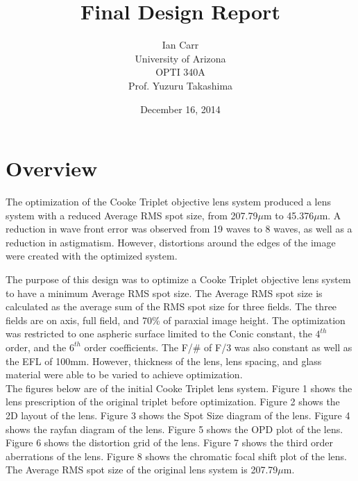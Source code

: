 \documentclass{article}
\begin{document}
\title{Final Design Report}
\author{Ian Carr\\
	University of Arizona\\
	OPTI 340A\\
	Prof. Yuzuru Takashima}
\date{December 16, 2014}
\maketitle

\newpage


\listoffigures 


\section*{Overview}
The optimization of the Cooke Triplet objective lens system produced a lens system with a reduced Average RMS spot size, from 207.79$\mu$m to 45.376$\mu$m. A reduction in wave front error was observed from 19 waves to 8 waves, as well as a reduction in astigmatism. However, distortions around the edges of the image were created with the optimized system.

\newpage

The purpose of this design was to optimize a Cooke Triplet objective lens system to have a minimum Average RMS spot size. The Average RMS spot size is calculated as the average sum of the RMS spot size for three fields. The three fields are on axis, full field, and 70\% of paraxial image height. The optimization was restricted to one aspheric surface limited to the Conic constant, the $4^{th}$ order, and the $6^{th}$ order coefficients. The F/\# of F/3 was also constant as well as the EFL of 100mm. However, thickness of the lens, lens spacing, and glass material were able to be varied to achieve optimization.\\

The figures below are of the initial Cooke Triplet lens system. Figure 1 shows the lens prescription of the original triplet before optimization. Figure 2 shows the 2D layout of the lens. Figure 3 shows the Spot Size diagram of the lens. Figure 4 shows the rayfan diagram of the lens. Figure 5 shows the OPD plot of the lens. Figure 6 shows the distortion grid of the lens. Figure 7 shows the third order aberrations of the lens. Figure 8 shows the chromatic focal shift plot of the lens. \\

The Average RMS spot size of the original lens system is 207.79$\mu$m.\\
\end{document}
